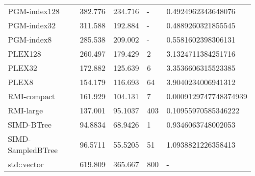 \begin{tabular}{lrrll}
 PGM-index128      &               382.776  &              234.716  & -            & 0.4924962343648076    \\
 PGM-index32       &               311.588  &              192.884  & -            & 0.4889260321855545    \\
 PGM-index8        &               285.538  &              209.002  & -            & 0.5581602398306131    \\
 PLEX128           &               260.497  &              179.429  & 2            & 3.1324711384251716    \\
 PLEX32            &               172.882  &              125.639  & 6            & 3.3536606315523385    \\
 PLEX8             &               154.179  &              116.693  & 64           & 3.9040234006941312    \\
 RMI-compact       &               161.929  &              104.131  & 7            & 0.0009129747748374939 \\
 RMI-large         &               137.001  &               95.1037 & 403          & 0.10955970585346222   \\
 SIMD-BTree        &                94.8834 &               68.9426 & 1            & 0.9346063748002053    \\
 SIMD-SampledBTree &                96.5711 &               55.5205 & 51           & 1.0938821226358413    \\
 std::vector       &               619.809  &              365.667  & 800          & -                     \\
\hline
\end{tabular}
